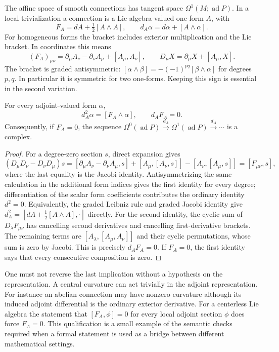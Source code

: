 The affine space of smooth connections has tangent space
$\Omega^1(M;\operatorname{ad}P)$.  In a local trivialization a connection is
a Lie-algebra-valued one-form $A$, with
\begin{equation}
 F_A=dA+\tfrac12[A\wedge A],\qquad
 d_A\alpha=d\alpha+[A\wedge\alpha].
 \label{eq:curvature-conventions}
\end{equation}
For homogeneous forms the bracket includes exterior multiplication and the
Lie bracket.  In coordinates this means
\[
 (F_A)_{\mu\nu}=\partial_\mu A_\nu-\partial_\nu A_\mu+[A_\mu,A_\nu],
 \qquad D_\mu X=\partial_\mu X+[A_\mu,X].
\]
The bracket is graded antisymmetric:
$[\alpha\wedge\beta]=-(-1)^{pq}[\beta\wedge\alpha]$ for degrees $p,q$.
In particular it is symmetric for two one-forms.  Keeping this sign is
essential in the second variation.

\begin{proposition}
For every adjoint-valued form $\alpha$,
\begin{equation}
 d_A^2\alpha=[F_A\wedge\alpha],\qquad d_AF_A=0.
 \label{eq:curvature-square}
\end{equation}
Consequently, if $F_A=0$, the sequence
$\Omega^0(\operatorname{ad}P)\xrightarrow{d_A}
\Omega^1(\operatorname{ad}P)\xrightarrow{d_A}\cdots$ is a complex.
\end{proposition}

\begin{proof}
For a degree-zero section $s$, direct expansion gives
\[
 (D_\mu D_\nu-D_\nu D_\mu)s
 =[\partial_\mu A_\nu-\partial_\nu A_\mu,s]
   +[A_\mu,[A_\nu,s]]-[A_\nu,[A_\mu,s]]
 =[F_{\mu\nu},s],
\]
where the last equality is the Jacobi identity.  Antisymmetrizing the same
calculation in the additional form indices gives the first identity for every
degree; differentiation of the scalar form coefficients contributes the
ordinary identity $d^2=0$.  Equivalently, the graded Leibniz rule and graded
Jacobi identity give
$d_A^2=[dA+\frac12[A\wedge A],\cdot]$ directly.
For the second identity, the cyclic sum of
$D_\lambda F_{\mu\nu}$ has cancelling second derivatives and cancelling
first-derivative brackets.  The remaining terms are
$[A_\lambda,[A_\mu,A_\nu]]$ and their cyclic permutations, whose sum is
zero by Jacobi.  This is precisely $d_AF_A=0$.  If $F_A=0$, the first
identity says that every consecutive composition is zero.
\end{proof}

One must not reverse the last implication without a hypothesis on the
representation.  A central curvature can act trivially in the adjoint
representation.  For instance an abelian connection may have nonzero
curvature although its induced adjoint differential is the ordinary exterior
derivative.  For a centerless Lie algebra the statement that
$[F_A,\phi]=0$ for every local adjoint section $\phi$ does force $F_A=0$.
This qualification is a small example of the semantic checks required when a
formal statement is used as a bridge between different mathematical settings.

